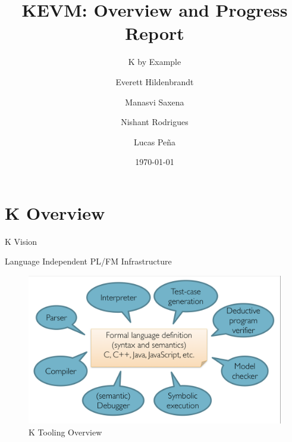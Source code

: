 \documentclass[8pt,ignorenonframetext,]{beamer}
\title{KEVM: Overview and Progress Report}
\subtitle{K by Example}
\author{Everett Hildenbrandt \and Manasvi Saxena \and Nishant Rodrigues \and Lucas Peña}
\institute{University of Illinois, Urbana-Champaign}
\date{\today}
\begin{document}
\frame{\titlepage}

\section{K Overview}\label{k-overview}

\begin{frame}{K Vision}

\pause

\begin{block}{Language Independent PL/FM Infrastructure}

\begin{figure}
\centering
\includegraphics{k-overview.png}
\caption{K Tooling Overview}
\end{figure}

\end{block}

\end{frame}
\end{document}
